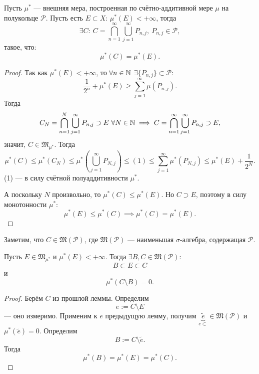 \begin{lemma}
    Пусть $\mu^*$ — внешняя мера, построенная по счётно-аддитивной мере $\mu$ на полукольце $\mathcal{P}$.
    Пусть есть $E \subset X$: $\mu^*(E) < +\infty$, тогда
    \[\exists C: \ C = \bigcap\limits_{n=1}^{\infty} \bigcup\limits_{j=1}^{\infty} P_{n,j}, \ P_{n,j} \in \mathcal{P},\]
    такое, что:
    \[\mu^*(C) = \mu^*(E).\]
\end{lemma} 
\begin{proof}
    Так как $\mu^*(E) < + \infty$, то $\forall n \in \mathbb{N}$ $\exists \{P_{n,j}\} \subset \mathcal{P}:$
    \[\frac{1}{2^n} + \mu^*(E) \geqslant \sum\limits_{j=1}^{\infty} \mu(P_{n,j}).\]
    Тогда
    \[C_N = \bigcap\limits_{n=1}^{N} \bigcup\limits_{j=1}^{\infty} P_{n,j} \supset E \ \forall N \in \mathbb{N} \implies 
    C = \bigcap\limits_{n=1}^{\infty} \bigcup\limits_{j=1}^{\infty} P_{n,j} \supset E,\]
    значит, $C \in \mathfrak{M}_{\mu^*}$.
    Тогда 
    \[\mu^*(C) \leqslant \mu^*(C_N) \leqslant \mu^*\left(\bigcup\limits_{j=1}^{\infty} P_{N,j}\right) \leqslant (1) \leqslant \sum\limits_{j=1}^{\infty} \mu^*(P_{N,j}) \leqslant \mu^*(E) + \frac{1}{2^N}.\]
    (1) — в силу счётной полуаддитивности $\mu^*$.

    А поскольку $N$ произвольно, то $\mu^*(C) \leqslant \mu^*(E)$. Но $C \supset E$, поэтому в силу монотонности $\mu^*$:
    \[\mu^*(E) \leqslant \mu^*(C) \implies \mu^*(C) = \mu^*(E).\]
\end{proof} 

\begin{remark}
    Заметим, что $C \in \mathfrak{M}(\mathcal{P})$, где $\mathfrak{M}(\mathcal{P})$ — наименьшая $\sigma$-алгебра, содержащая $\mathcal{P}$.
\end{remark}

\begin{theorem}
    Пусть $E \in \mathfrak{M}_{\mu^*}$ и $\mu^*(E) < + \infty$.
    Тогда $\exists B, C \in \mathfrak{M}(\mathcal{P}):$
    \[B \subset E \subset C\]
    и
    \[\mu^*(C \setminus B) = 0.\]
\end{theorem} 
\begin{proof}
    Берём $C$ из прошлой леммы.
    Определим \[e := C \setminus E\]
    — оно измеримо.
    Применим к $e$ предыдущую лемму, получим $\underbrace{\widetilde{e}}_{e \subset} \in \mathfrak{M}(\mathcal{P})$ и $\mu^*(\widetilde{e}) = 0$.
    Определим \[B := C \setminus \widetilde{e}.\]
    Тогда \[\mu^*(B) = \mu^*(E) = \mu^*(C).\]
\end{proof} 

